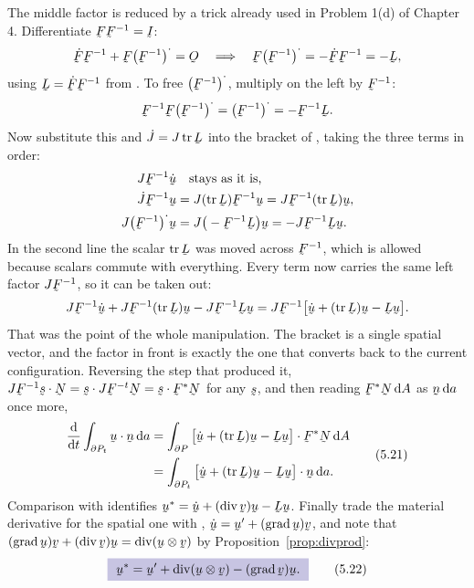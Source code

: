 The middle factor is reduced by a trick already used in Problem 1(d) of
Chapter 4. Differentiate $\bF\bF^{-1}=\I$:
\[
   \dot\bF\bF^{-1}+\bF\big(\bF^{-1}\big)^{\textstyle\cdot}=\Ob
   \quad\Longrightarrow\quad
   \bF\big(\bF^{-1}\big)^{\textstyle\cdot}=-\dot\bF\bF^{-1}=-\bL ,
\]
using $\bL=\dot\bF\bF^{-1}$ from . To free
$\big(\bF^{-1}\big)^{\textstyle\cdot}$, multiply on the left by
$\bF^{-1}$:
\[
   \bF^{-1}\bF\big(\bF^{-1}\big)^{\textstyle\cdot}
   =\big(\bF^{-1}\big)^{\textstyle\cdot}
   =-\bF^{-1}\bL .
\]
Now substitute this and $\dot J=J\tr\bL$ into the bracket of ,
taking the three terms in order:
\[
\begin{aligned}
   J\bF^{-1}\dot\bu
     &\quad\text{stays as it is,}\\
   \dot J\bF^{-1}\bu
     &=J(\tr\bL)\bF^{-1}\bu
      =J\bF^{-1}(\tr\bL)\bu ,\\
   J\big(\bF^{-1}\big)^{\textstyle\cdot}\bu
     &=J\big(-\bF^{-1}\bL\big)\bu
      =-J\bF^{-1}\bL\bu .
\end{aligned}
\]
In the second line the scalar $\tr\bL$ was moved across $\bF^{-1}$, which
is allowed because scalars commute with everything. Every term now carries
the same left factor $J\bF^{-1}$, so it can be taken out:
\[
   J\bF^{-1}\dot\bu+J\bF^{-1}(\tr\bL)\bu-J\bF^{-1}\bL\bu
   =J\bF^{-1}\big[\dot\bu+(\tr\bL)\bu-\bL\bu\big].
\]
That was the point of the whole manipulation. The bracket is a single
spatial vector, and the factor in front is exactly the one that converts
back to the current configuration. Reversing the step that produced it,
$\ip{J\bF^{-1}\bs}\bN=\ip\bs{J\bF^{-t}\bN}=\ip\bs{\bF^{*}\bN}$ for any
$\bs$, and then reading $\bF^{*}\bN\,\dl A$ as $\bn\,\dl a$ once more,
\begin{equation}
\begin{aligned}
   \frac{\dl}{\dl t}\int_{\partial P_{t}}\ip\bu\bn\,\dl a
   &=\int_{\partial P}\ip{\big[\dot\bu+(\tr\bL)\bu-\bL\bu\big]}{\bF^{*}\bN}\,\dl A
   \\
   &=\int_{\partial P_{t}}\ip{\big[\dot\bu+(\tr\bL)\bu-\bL\bu\big]}\bn\,\dl a .
\end{aligned}
   \tag{5.21}\label{eq:5.21}
\end{equation}
Comparison with  identifies $\bu^{*}=\dot\bu+(\dvg\bv)\bu
-\bL\bu$. Finally trade the material derivative for the spatial one with
, $\dot\bu=\bu'+(\grad\bu)\bv$, and note that
$(\grad\bu)\bv+(\dvg\bv)\bu=\dvg(\bu\otimes\bv)$ by
Proposition~\ref{prop:divprod}:
\begin{equation}
   \boxed{\ \bu^{*}=\bu'+\dvg(\bu\otimes\bv)-(\grad\bv)\bu .\ }
   \tag{5.22}\label{eq:5.22}
\end{equation}

